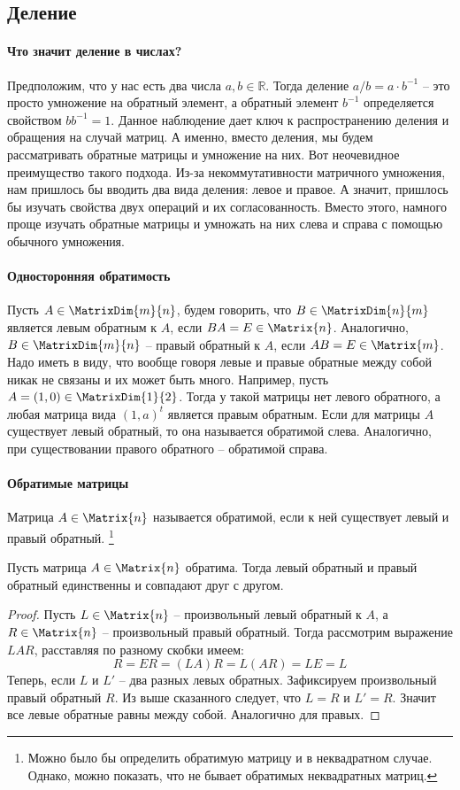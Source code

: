 \subsection{Деление}

\paragraph{Что значит деление в числах?}
Предположим, что у нас есть два числа $a,b\in\mathbb R$.
Тогда деление $a/b = a \cdot b^{-1}$ -- это просто умножение на обратный элемент, а обратный элемент $b^{-1}$ определяется свойством $b b^{-1} = 1$.
Данное наблюдение дает ключ к распространению деления и обращения на случай матриц.
А именно, вместо деления, мы будем рассматривать обратные матрицы и умножение на них.
Вот неочевидное преимущество такого подхода.
Из-за некоммутативности матричного умножения, нам пришлось бы вводить два вида деления: левое и правое.
А значит, пришлось бы изучать свойства двух операций и их согласованность.
Вместо этого, намного проще изучать обратные матрицы и умножать на них слева и справа с помощью обычного умножения.

\paragraph{Односторонняя обратимость}
Пусть $A\in\MatrixDim{m}{n}$, будем говорить, что $B\in\MatrixDim{n}{m}$ является левым обратным к $A$, если $BA = E\in\Matrix{n}$.
Аналогично, $B\in\MatrixDim{m}{n}$ -- правый обратный к $A$, если $AB = E\in\Matrix{m}$.
Надо иметь в виду, что вообще говоря левые и правые обратные между собой никак не связаны и их может быть много.
Например, пусть $A = (1, 0)\in\MatrixDim{1}{2}$.
Тогда у такой матрицы нет левого обратного, а любая матрица вида $(1, a)^t$ является правым обратным.
Если для матрицы $A$ существует левый обратный, то она называется обратимой слева.
Аналогично, при существовании правого обратного -- обратимой справа.

\paragraph{Обратимые матрицы}
Матрица $A\in\Matrix{n}$ называется обратимой, если к ней существует левый и правый обратный.%
\footnote{Можно было бы определить обратимую матрицу и в неквадратном случае.
Однако, можно показать, что не бывает обратимых неквадратных матриц.}

\begin{claim*}
Пусть матрица $A\in\Matrix{n}$ обратима.
Тогда левый обратный и правый обратный единственны и совпадают друг с другом.
\end{claim*}
\begin{proof}
Пусть $L\in\Matrix{n}$ -- произвольный левый обратный к $A$, а $R\in\Matrix{n}$ -- произвольный правый обратный.
Тогда рассмотрим выражение $LAR$, расставляя по разному скобки имеем:
\[
R = ER = (LA)R = L (AR) = LE = L
\]
Теперь, если $L$ и $L'$ -- два разных левых обратных.
Зафиксируем произвольный правый обратный $R$.
Из выше сказанного следует, что $L = R$ и $L' = R$.
Значит все левые обратные равны между собой.
Аналогично для правых.
\end{proof}

